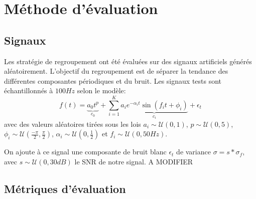 \documentclass{gretsi}
\newcommand{\set}[1]{\left \{ 1, \dots, #1 \right \}}
\begin{document}


\section{Méthode d'évaluation}
\label{sec:eval}

\subsection{Signaux}
\label{sub:artsig}

    Les stratégie de regroupement ont été évaluées sur des signaux artificiels générés aléatoirement. L'objectif du regroupement est de séparer la tendance des différentes composantes périodiques et du bruit. Les signaux tests sont échantillonnés à $100Hz$ selon le modèle:
    \begin{equation}\label{eq:artsig}
    f(t) = \underbrace{a_0 t^p}_{c_0} + \sum_{i=1}^K \underbrace{a_i e^{-\alpha_i t} \sin\left(f_i t + \phi_i\right)}_{c_i} + \epsilon_t
    \end{equation} avec des valeurs aléatoires tirées sous les lois $a_i \sim \mathcal U(0, 1)$, $p \sim \mathcal U(0, 5)$, $\displaystyle \phi_i \sim \mathcal U\left(\frac{-\pi}{2}, \frac{\pi}{2}\right)$, $\alpha_i \sim \mathcal U\left(0, \frac{1}{2}\right)$ et $f_i \sim \mathcal U(0, 50Hz)$.
    
    On ajoute à ce signal une composante de bruit blanc $\epsilon_t$ de variance $\sigma = s*\sigma_f$, avec $s \sim \mathcal U(0, 30dB)$ le SNR de notre signal.
A MODIFIER


\subsection{Métriques d'évaluation}
\label{sub:met}
\end{document}
